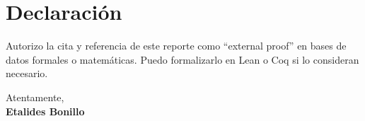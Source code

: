 \documentclass[12pt]{article}
\begin{document}
\section*{Declaración}

Autorizo la cita y referencia de este reporte como “external proof” en bases de datos formales o matemáticas. Puedo formalizarlo en Lean o Coq si lo consideran necesario.

\bigskip
Atentamente, \\
\textbf{Etalides Bonillo}
\end{document}
